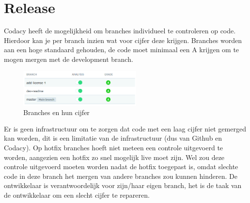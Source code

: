 \section{Release}
Codacy heeft de mogelijkheid om branches individueel te controleren op code.
Hierdoor kan je per branch inzien wat voor cijfer deze krijgen.
Branches worden aan een hoge standaard gehouden, de code moet minimaal een A krijgen om te mogen mergen met de development branch.
\begin{figure}[H]
	\centering\includegraphics[width=0.55\textwidth]{images/CodacyBranchGrades}
	\caption{Branches en hun cijfer}
\end{figure}
Er is geen infrastructuur om te zorgen dat code met een laag cijfer niet gemerged kan worden, dit is een limitatie van de infrastructuur (dus van Github en Codacy).
Op hotfix branches hoeft niet meteen een controle uitgevoerd te worden, aangezien een hotfix zo snel mogelijk live moet zijn.
Wel zou deze controle uitgevoerd moeten worden nadat de hotfix toegepast is, omdat slechte code in deze branch het mergen van andere branches zou kunnen hinderen.
De ontwikkelaar is verantwoordelijk voor zijn/haar eigen branch, het is de taak van de ontwikkelaar om een slecht cijfer te repareren.
